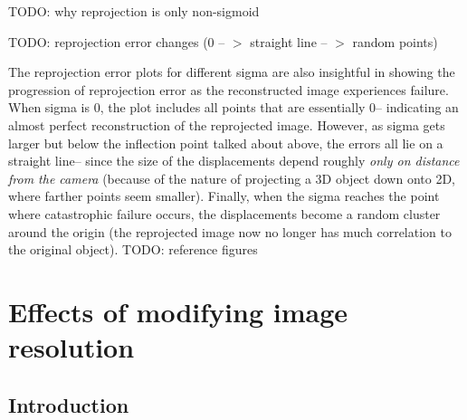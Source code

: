 \documentclass{article}
\begin{document}


TODO: why reprojection is only non-sigmoid



TODO: reprojection error changes (0 -- $>$ straight line -- $>$ random points)

The reprojection error plots for different sigma are also insightful in showing the progression of reprojection error as the reconstructed image experiences failure. When sigma is 0, the plot includes all points that are essentially 0-- indicating an almost perfect reconstruction of the reprojected image. However, as sigma gets larger but below the inflection point talked about above, the errors all lie on a straight line-- since the size of the displacements depend roughly \textit{only on distance from the camera} (because of the nature of projecting a 3D object down onto 2D, where farther points seem smaller). Finally, when the sigma reaches the point where catastrophic failure occurs, the displacements become a random cluster around the origin (the reprojected image now no longer has much correlation to the original object). TODO: reference figures









\section{Effects of modifying image resolution}

\subsection{Introduction}
\end{document}
